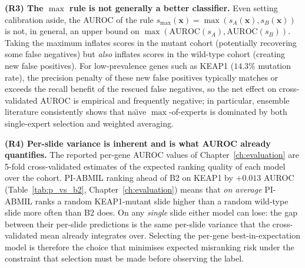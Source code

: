 \textbf{(R3) The $\max$ rule is not generally a better
classifier.}
Even setting calibration aside, the AUROC of the rule
$s_{\max}(\mathbf{x}) = \max(s_A(\mathbf{x}), s_B(\mathbf{x}))$
is not, in general, an upper bound on
$\max(\mathrm{AUROC}(s_A), \mathrm{AUROC}(s_B))$.
Taking the maximum inflates scores in the mutant cohort
(potentially recovering some false negatives) but \emph{also}
inflates scores in the wild-type cohort (creating new false
positives).
For low-prevalence genes such as KEAP1 ($14.3\%$ mutation rate),
the precision penalty of these new false positives typically
matches or exceeds the recall benefit of the rescued false
negatives, so the net effect on cross-validated AUROC is empirical
and frequently negative; in particular, ensemble literature
consistently shows that na\"{\i}ve $\max$-of-experts is dominated
by both single-expert selection and weighted averaging.

\textbf{(R4) Per-slide variance is inherent and is what AUROC
already quantifies.}
The reported per-gene AUROC values of Chapter~\ref{ch:evaluation}
are 5-fold cross-validated estimates of the expected ranking
quality of each model over the cohort.
PI-ABMIL ranking ahead of B2 on KEAP1 by $+0.013$ AUROC
(Table~\ref{tab:p_vs_b2}, Chapter~\ref{ch:evaluation}) means that
\emph{on average} PI-ABMIL ranks a random KEAP1-mutant slide
higher than a random wild-type slide more often than B2 does.
On any \emph{single} slide either model can lose: the gap between
their per-slide predictions is the same per-slide variance that
the cross-validated mean already integrates over.
Selecting the per-gene best-in-expectation model is therefore the
choice that minimises expected misranking risk under the
constraint that selection must be made before observing the
label.

